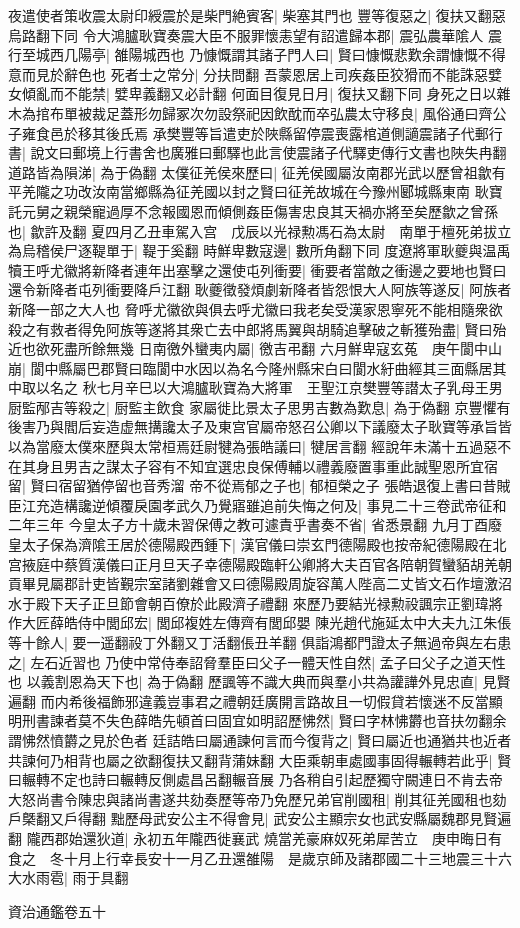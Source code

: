 夜遣使者策收震太尉印綬震於是柴門絶賓客|{
	柴塞其門也}
豐等復惡之|{
	復扶又翻惡烏路翻下同}
令大鴻臚耿寶奏震大臣不服罪懷恚望有詔遣歸本郡|{
	震弘農華隂人}
震行至城西几陽亭|{
	雒陽城西也}
乃慷慨謂其諸子門人曰|{
	賢曰慷慨悲歎余謂慷慨不得意而見於辭色也}
死者士之常分|{
	分扶問翻}
吾蒙恩居上司疾姦臣狡猾而不能誅惡嬖女傾亂而不能禁|{
	嬖卑義翻又必計翻}
何面目復見日月|{
	復扶又翻下同}
身死之日以雜木為捾布單被裁足蓋形勿歸冢次勿設祭祀因飲酖而卒弘農太守移良|{
	風俗通曰齊公子雍食邑於移其後氏焉}
承樊豐等旨遣吏於陜縣留停震喪露棺道側讁震諸子代郵行書|{
	說文曰郵境上行書舍也廣雅曰郵驛也此言使震諸子代驛吏傳行文書也陜失冉翻}
道路皆為隕涕|{
	為于偽翻}
太僕征羌侯來歷曰|{
	征羌侯國屬汝南郡光武以歷曾祖歙有平羌隴之功改汝南當鄉縣為征羌國以封之賢曰征羌故城在今豫州郾城縣東南}
耿寶託元舅之親榮寵過厚不念報國恩而傾側姦臣傷害忠良其天禍亦將至矣歷歙之曾孫也|{
	歙許及翻}
夏四月乙丑車駕入宫　戊辰以光禄勲馮石為太尉　南單于檀死弟拔立為烏稽侯尸逐鞮單于|{
	鞮于奚翻}
時鮮卑數寇邊|{
	數所角翻下同}
度遼將軍耿夔與温禹犢王呼尤徽將新降者連年出塞擊之還使屯列衝要|{
	衝要者當敵之衝邊之要地也賢曰還令新降者屯列衝要降戶江翻}
耿夔徵發煩劇新降者皆怨恨大人阿族等遂反|{
	阿族者新降一部之大人也}
脅呼尤徽欲與俱去呼尤徽曰我老矣受漢家恩寧死不能相隨衆欲殺之有救者得免阿族等遂將其衆亡去中郎將馬翼與胡騎追擊破之斬獲殆盡|{
	賢曰殆近也欲死盡所餘無幾}
日南徼外蠻夷内屬|{
	徼吉弔翻}
六月鮮卑寇玄菟　庚午閬中山崩|{
	閬中縣屬巴郡賢曰臨閬中水因以為名今隆州縣宋白曰閬水紆曲經其三面縣居其中取以名之}
秋七月辛巳以大鴻臚耿寶為大將軍　王聖江京樊豐等譛太子乳母王男厨監邴吉等殺之|{
	厨監主飲食}
家屬徙比景太子思男吉數為歎息|{
	為于偽翻}
京豐懼有後害乃與閻后妄造虚無搆讒太子及東宫官屬帝怒召公卿以下議廢太子耿寶等承旨皆以為當廢太僕來歷與太常桓焉廷尉犍為張皓議曰|{
	犍居言翻}
經說年未滿十五過惡不在其身且男吉之謀太子容有不知宜選忠良保傅輔以禮義廢置事重此誠聖恩所宜宿留|{
	賢曰宿留猶停留也音秀溜}
帝不從焉郁之子也|{
	郁桓榮之子}
張皓退復上書曰昔賊臣江充造構讒逆傾覆戾園孝武久乃覺寤雖追前失悔之何及|{
	事見二十三卷武帝征和二年三年}
今皇太子方十歲未習保傅之教可遽責乎書奏不省|{
	省悉景翻}
九月丁酉廢皇太子保為濟隂王居於德陽殿西鍾下|{
	漢官儀曰崇玄門德陽殿也按帝紀德陽殿在北宫掖庭中蔡質漢儀曰正月旦天子幸德陽殿臨軒公卿將大夫百官各陪朝賀蠻貊胡羌朝貢畢見屬郡計吏皆覲宗室諸劉雜會又曰德陽殿周旋容萬人陛高二丈皆文石作壇激沼水于殿下天子正旦節會朝百僚於此殿濟子禮翻}
來歷乃要結光禄勲祋諷宗正劉瑋將作大匠薛皓侍中閭邱宏|{
	閭邱複姓左傳齊有閭邱嬰}
陳光趙代施延太中大夫九江朱倀等十餘人|{
	要一遥翻祋丁外翻又丁活翻倀丑羊翻}
俱詣鴻都門證太子無過帝與左右患之|{
	左石近習也}
乃使中常侍奉詔脅羣臣曰父子一體天性自然|{
	孟子曰父子之道天性也}
以義割恩為天下也|{
	為于偽翻}
歷諷等不識大典而與羣小共為讙譁外見忠直|{
	見賢遍翻}
而内希後福飾邪違義豈事君之禮朝廷廣開言路故且一切假貸若懷迷不反當顯明刑書諫者莫不失色薛皓先頓首曰固宜如明詔歷怫然|{
	賢曰字林怫欝也音扶勿翻余謂怫然憤欝之見於色者}
廷詰皓曰屬通諫何言而今復背之|{
	賢曰屬近也通猶共也近者共諫何乃相背也屬之欲翻復扶又翻背蒲妹翻}
大臣乘朝車處國事固得輾轉若此乎|{
	賢曰輾轉不定也詩曰輾轉反側處昌呂翻輾音展}
乃各稍自引起歷獨守闕連日不肯去帝大怒尚書令陳忠與諸尚書遂共劾奏歷等帝乃免歷兄弟官削國租|{
	削其征羌國租也劾戶槩翻又戶得翻}
黜歷母武安公主不得會見|{
	武安公主顯宗女也武安縣屬魏郡見賢遍翻}
隴西郡始還狄道|{
	永初五年隴西徙襄武}
燒當羌豪麻奴死弟犀苦立　庚申晦日有食之　冬十月上行幸長安十一月乙丑還雒陽　是歲京師及諸郡國二十三地震三十六大水雨雹|{
	雨于具翻}


資治通鑑卷五十
